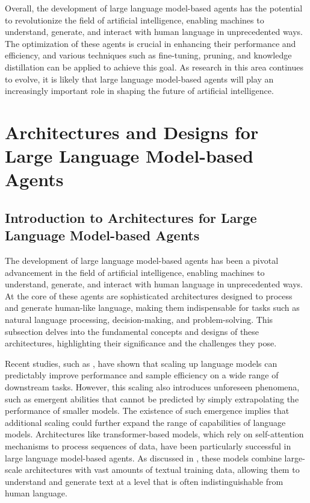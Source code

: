 \documentclass[11pt,a4paper]{article}
\begin{document}
Overall, the development of large language model-based agents has the potential to revolutionize the field of artificial intelligence, enabling machines to understand, generate, and interact with human language in unprecedented ways. The optimization of these agents is crucial in enhancing their performance and efficiency, and various techniques such as fine-tuning, pruning, and knowledge distillation can be applied to achieve this goal. As research in this area continues to evolve, it is likely that large language model-based agents will play an increasingly important role in shaping the future of artificial intelligence.


\section{Architectures and Designs for Large Language Model-based Agents}



\subsection{Introduction to Architectures for Large Language Model-based Agents}


The development of large language model-based agents has been a pivotal advancement in the field of artificial intelligence, enabling machines to understand, generate, and interact with human language in unprecedented ways. At the core of these agents are sophisticated architectures designed to process and generate human-like language, making them indispensable for tasks such as natural language processing, decision-making, and problem-solving. This subsection delves into the fundamental concepts and designs of these architectures, highlighting their significance and the challenges they pose.

Recent studies, such as \cite{arxiv:2206.07682}, have shown that scaling up language models can predictably improve performance and sample efficiency on a wide range of downstream tasks. However, this scaling also introduces unforeseen phenomena, such as emergent abilities that cannot be predicted by simply extrapolating the performance of smaller models. The existence of such emergence implies that additional scaling could further expand the range of capabilities of language models. Architectures like transformer-based models, which rely on self-attention mechanisms to process sequences of data, have been particularly successful in large language model-based agents. As discussed in \cite{doi:10.1016/j.metrad.2023.100017}, these models combine large-scale architectures with vast amounts of textual training data, allowing them to understand and generate text at a level that is often indistinguishable from human language.
\end{document}
